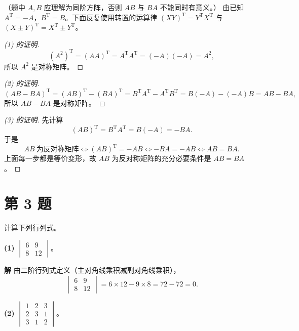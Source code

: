 \documentclass[11pt,a4paper]{ctexart}
\newenvironment{problem}[1]
  {\par\medskip\noindent\textbf{#1}\quad}
  {\par}
\newenvironment{solution}
  {\par\noindent\textbf{解}\quad}
  {\par}
\begin{document}
（题中 $A,B$ 应理解为同阶方阵，否则 $AB$ 与 $BA$ 不能同时有意义。）
由已知 $A^{\mathrm T}=-A$，$B^{\mathrm T}=B$。下面反复使用转置的运算律
$(XY)^{\mathrm T}=Y^{\mathrm T}X^{\mathrm T}$ 与 $(X\pm Y)^{\mathrm T}=X^{\mathrm T}\pm Y^{\mathrm T}$。

\begin{proof}[(1) 的证明]
\[
(A^2)^{\mathrm T}=(AA)^{\mathrm T}=A^{\mathrm T}A^{\mathrm T}=(-A)(-A)=A^2,
\]
所以 $A^2$ 是对称矩阵。
\end{proof}

\begin{proof}[(2) 的证明]
\[
(AB-BA)^{\mathrm T}=(AB)^{\mathrm T}-(BA)^{\mathrm T}
=B^{\mathrm T}A^{\mathrm T}-A^{\mathrm T}B^{\mathrm T}
=B(-A)-(-A)B
=AB-BA,
\]
所以 $AB-BA$ 是对称矩阵。
\end{proof}

\begin{proof}[(3) 的证明]
先计算
\[
(AB)^{\mathrm T}=B^{\mathrm T}A^{\mathrm T}=B(-A)=-BA.
\]
于是
\[
AB\ \text{为反对称矩阵}
\iff (AB)^{\mathrm T}=-AB
\iff -BA=-AB
\iff AB=BA.
\]
上面每一步都是等价变形，故 $AB$ 为反对称矩阵的充分必要条件是 $AB=BA$。
\end{proof}

\section*{第 3 题}

\begin{problem}{}计算下列行列式。\end{problem}

\textbf{(1)} $\begin{vmatrix}6&9\\8&12\end{vmatrix}$。

\begin{solution}
由二阶行列式定义（主对角线乘积减副对角线乘积），
\[
\begin{vmatrix}6&9\\8&12\end{vmatrix}=6\times12-9\times8=72-72=0.
\]
\end{solution}

\textbf{(2)} $\begin{vmatrix}1&2&3\\2&3&1\\3&1&2\end{vmatrix}$。
\end{document}
